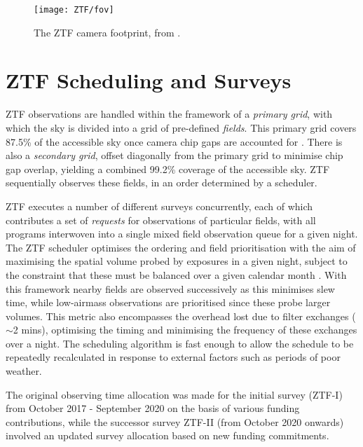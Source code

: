 \begin{figure*}
	\centering \texttt{[image: ZTF/fov]}
	\caption{The ZTF camera footprint, from \cite{laher_18}.}
	\label{fig:ztf_footprint}
\end{figure*}

\section{ZTF Scheduling and Surveys}
\label{sec:survey}

ZTF observations are handled within the framework of a \emph{primary grid}, with which the sky is divided into a grid of pre-defined \emph{fields}. This primary grid covers 87.5\% of the accessible sky once camera chip gaps are accounted for . There is also a \emph{secondary grid}, offset diagonally from the primary grid to minimise chip gap overlap, yielding a combined 99.2\% coverage of the accessible sky. ZTF sequentially observes these fields, in an order determined by a scheduler. 

ZTF executes a number of different surveys concurrently, each of which contributes a set of \emph{requests} for observations of particular fields, with all programs interwoven into a single mixed field observation queue for a given night. The ZTF scheduler optimises the ordering and field prioritisation with the aim of maximising the spatial volume probed by exposures in a given night, subject to the constraint that these must be balanced over a given calendar month \cite{ztf_survey_19}. With this framework nearby fields are observed successively as this minimises slew time, while low-airmass observations are prioritised since these probe larger volumes. This metric also encompasses the overhead lost due to filter exchanges ($\sim$2 mins), optimising the timing and minimising the frequency of these exchanges over a night. The scheduling algorithm is fast enough to allow the schedule to be repeatedly recalculated in response to external factors such as periods of poor weather.

The original observing time allocation was made for the initial survey (ZTF-I) from October 2017 - September 2020 on the basis of various funding contributions, while the successor survey ZTF-II (from October 2020 onwards) involved an updated survey allocation based on new funding commitments.


